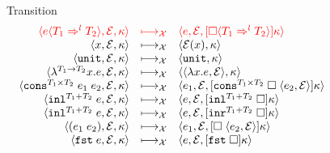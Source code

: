 \documentclass[acmsmall,review]{acmart}\settopmatter{printfolios=true,printccs=false,printacmref=false}
\newcommand{\plus}[0]{+}
\newcommand{\lazyUD}{Lazy\;UD}
\newcommand{\lazyD}{Lazy\;D}
\newcommand{\sOOinspect}[3]{\langle#1,#2,#3\rangle}
\newcommand{\sOOreturn}[2]{\langle#1,#2\rangle}
\newcommand{\POOprod}[2]{#1 \times #2}
\newcommand{\POOsum}[2]{#1 \plus #2}
\newcommand{\eOOvar}[1]{#1}
\newcommand{\eOOsole}[0]{\mathtt{unit}}
\newcommand{\eOOlam}[4]{\lambda^{#1\rightarrow{}#2}#3.#4}
\newcommand{\eOOapp}[2]{(#1 \; #2)}
\newcommand{\eOOcons}[4]{\mathtt{cons}^{\POOprod{#1}{#2}} \; #3 \; #4}
\newcommand{\eOOcar}[1]{\mathtt{fst} \; #1}
\newcommand{\eOOinl}[3]{\mathtt{inl}^{\POOsum{#1}{#2}} \; #3}
\newcommand{\eOOcast}[4]{#1 \langle \cOOcast{#2}{#3}{#4} \rangle}
\newcommand{\cOOcast}[3]{#1 \Rightarrow^{#2} #3}
\newcommand{\vOOfun}[3]{\langle \lambda  #2. #3, #1 \rangle}
\newcommand{\vOOtt}[0]{\mathtt{unit}}
\newcommand{\kOOconsI}[5]{
	[\mathtt{cons}^{\POOprod{#1}{#2}} \; \square \; \langle#3,#4\rangle ]#5}
\newcommand{\kOOinl}[3]{[\mathtt{inl}^{\POOsum{#1}{#2}}\; \square]#3}
\newcommand{\kOOinr}[3]{[\mathtt{inr}^{\POOsum{#1}{#2}}\; \square]#3}
\newcommand{\kOOappI}[3]{
  [\square \; \langle#1,#2\rangle]#3
}
\newcommand{\kOOcar}[1]{[\mathtt{fst} \; \square]#1}
\newcommand{\kOOcast}[2]{
  [\square \langle #1 \rangle]#2}
\newcommand{\judgeCreduce}[2]{#1 \longmapsto_{\mathcal{X}} #2}
\newcommand{\redrule}[3]{#1 & \longmapsto_\mathcal{X} & #2 & #3\\}
\newcommand{\hiredrule}[3]{\highlight{#1} & \highlight{\longmapsto_\mathcal{X}} 
& \highlight{#2} & \highlight{#3} \\}
\newcommand{\highlight}[1]{{\color{red} #1}}
\begin{document}

\begin{figure}
  
  \[
  \begin{array}{rclr}
  \end{array}
  \]
  
  Transition \fbox{$\judgeCreduce{s}{s}$}
  \[
  \begin{array}{rclr}
    \hiredrule{
    \sOOinspect{\eOOcast{e}{T_1}{l}{T_2}}{\mathcal{E}}{\kappa}
  }{
    \sOOinspect{e}{\mathcal{E}}{
      \kOOcast{\cOOcast{T_1}{l}{T_2}}{\kappa}
    }
  }{}
  \redrule{
    \sOOinspect{\eOOvar{x}}{\mathcal{E}}{\kappa}
  }{  
    \sOOreturn{\mathcal{E}(x)}{\kappa}
  }{}
  \redrule{
    \sOOinspect{\eOOsole}{\mathcal{E}}{\kappa}
  }{
    \sOOreturn{\vOOtt}{\kappa}
  }{}
  \redrule{
    \sOOinspect{\eOOlam{T_1}{T_2}{x}{e}}{\mathcal{E}}{\kappa}
  }{
    \sOOreturn{\vOOfun{\mathcal{E}}{x}{e}}{\kappa}
  }{}
  \redrule{
    \sOOinspect{\eOOcons{T_1}{T_2}{e_1}{e_2}}{\mathcal{E}}{\kappa}
  }{
    \sOOinspect{e_1}{\mathcal{E}}{\kOOconsI{T_1}{T_2}{e_2}{\mathcal{E}}{\kappa}}
  }{}
  \redrule{
    \sOOinspect{\eOOinl{T_1}{T_2}{e}}{\mathcal{E}}{\kappa}
  }{
    \sOOinspect{e}{\mathcal{E}}{\kOOinl{T_1}{T_2}{\kappa}}
  }{}
  \redrule{
  \sOOinspect{\eOOinl{T_1}{T_2}{e}}{\mathcal{E}}{\kappa}
  }{
  \sOOinspect{e}{\mathcal{E}}{\kOOinr{T_1}{T_2}{\kappa}}
  }{}
  \redrule{
    \sOOinspect{\eOOapp{e_1}{e_2}}{\mathcal{E}}{\kappa}
  }{
\sOOinspect{e_1}{\mathcal{E}}{\kOOappI{e_2}{\mathcal{E}}{\kappa}}}{}

\redrule{
\sOOinspect{\eOOcar{e}}{\mathcal{E}}{\kappa}}{
\sOOinspect{e}{\mathcal{E}}{\kOOcar{\kappa}}}{}


\end{array}\]
\end{figure}
\end{document}
